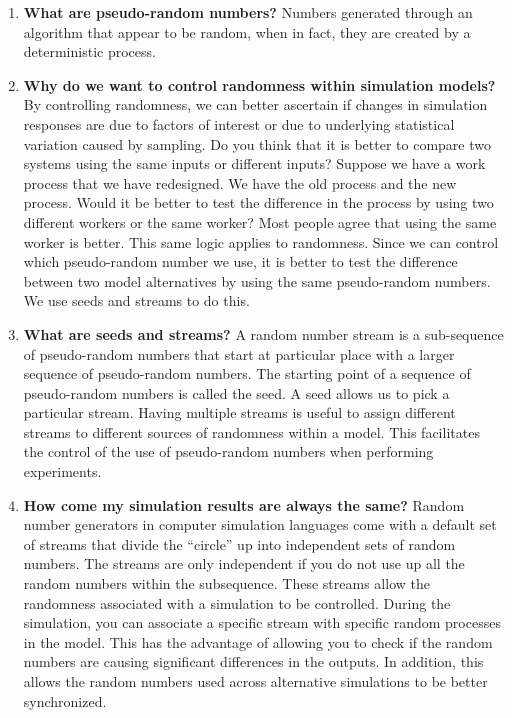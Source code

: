 \documentclass[
]{book}
\theoremstyle{definition}
\theoremstyle{definition}
\theoremstyle{definition}
\theoremstyle{definition}
\theoremstyle{remark}
\begin{document}
\begin{enumerate}
\def\labelenumi{\arabic{enumi}.}
\item
  \textbf{What are pseudo-random numbers?}
  Numbers generated through an algorithm that appear to be random, when in fact, they are created by a deterministic process.
\item
  \textbf{Why do we want to control randomness within simulation models?}
  By controlling randomness, we can better ascertain if changes in simulation responses are due to factors of interest or due to underlying statistical variation caused by sampling. Do you think that it is better to compare two systems using the same inputs or different inputs? Suppose we have a work process that we have redesigned. We have the old process and the new process. Would it be better to test the difference in the process by using two different workers or the same worker? Most people agree that using the same worker is better. This same logic applies to randomness. Since we can control which pseudo-random number we use, it is better to test the difference between two model alternatives by using the same pseudo-random numbers. We use seeds and streams to do this.
\item
  \textbf{What are seeds and streams?}
  A random number stream is a sub-sequence of pseudo-random numbers that start at particular place with a larger sequence of pseudo-random numbers. The starting point of a sequence of pseudo-random numbers is called the seed. A seed allows us to pick a particular stream. Having multiple streams is useful to assign different streams to different sources of randomness within a model. This facilitates the control of the use of pseudo-random numbers when performing experiments.
\item
  \textbf{How come my simulation results are always the same?}
  Random number generators in computer simulation languages come with a default set of streams that divide the ``circle'' up into independent sets of random numbers. The streams are only independent if you do not use up all the random numbers within the subsequence. These streams allow the randomness associated with a simulation to be controlled. During the simulation, you can associate a specific stream with specific random processes in the model. This has the advantage of allowing you to check if the random numbers are causing significant differences in the outputs. In addition, this allows the random numbers used across alternative simulations to be better synchronized.

\end{enumerate}
\end{document}
